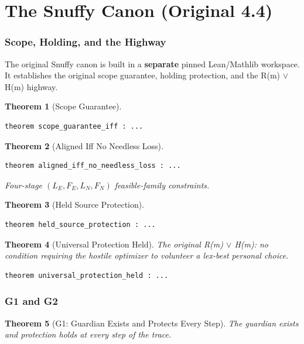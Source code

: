 \documentclass[11pt,a4paper]{article}
\newtheorem{theorem}{Theorem}[section]
\theoremstyle{definition}
\theoremstyle{remark}
\begin{document}
\part{The Snuffy Canon (Original 4.4)}

\section{Scope, Holding, and the Highway}

The original Snuffy canon is built in a \textbf{separate} pinned Lean/Mathlib workspace. It establishes the original scope guarantee, holding protection, and the R(m) $\vee$ H(m) highway.

\begin{theorem}[Scope Guarantee]
\begin{lstlisting}
theorem scope_guarantee_iff : ...
\end{lstlisting}
\end{theorem}

\begin{theorem}[Aligned Iff No Needless Loss]
\begin{lstlisting}
theorem aligned_iff_no_needless_loss : ...
\end{lstlisting}
Four-stage $(L_E, F_E, L_N, F_N)$ feasible-family constraints.
\end{theorem}

\begin{theorem}[Held Source Protection]
\begin{lstlisting}
theorem held_source_protection : ...
\end{lstlisting}
\end{theorem}

\begin{theorem}[Universal Protection Held]
The original R(m) $\vee$ H(m): no condition requiring the hostile optimizer to volunteer a lex-best personal choice.
\begin{lstlisting}
theorem universal_protection_held : ...
\end{lstlisting}
\end{theorem}

\section{G1 and G2}

\begin{theorem}[G1: Guardian Exists and Protects Every Step]
The guardian exists and protection holds at every step of the trace.
\end{theorem}
\end{document}
